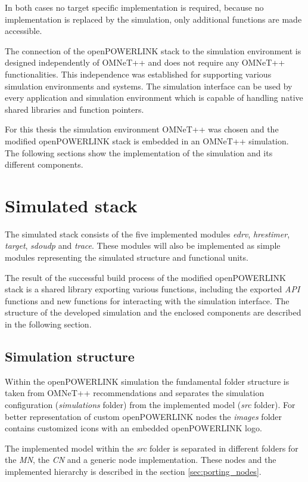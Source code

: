 In both cases no target specific implementation is required, because no implementation is replaced by the simulation, only additional functions are made accessible.

The connection of the openPOWERLINK stack to the simulation environment is designed independently of OMNeT++ and does not require any OMNeT++ functionalities.
This independence was established for supporting various simulation environments and systems.
The simulation interface can be used by every application and simulation environment which is capable of handling native shared libraries and function pointers.

For this thesis the simulation environment OMNeT++ was chosen and the modified openPOWERLINK stack is embedded in an OMNeT++ simulation.
The following sections show the implementation of the simulation and its different components.

\section{Simulated stack}
\label{sec:porting_stack}
The simulated stack consists of the five implemented modules \emph{edrv}, \emph{hrestimer}, \emph{target}, \emph{sdoudp} and \emph{trace}.
These modules will also be implemented as simple modules representing the simulated structure and functional units.

\begin{sloppypar}
The result of the successful build process of the modified openPOWERLINK stack is a shared library exporting various functions, including the exported \emph{API} functions and new functions for interacting with the simulation interface.
The structure of the developed simulation and the enclosed components are described in the following section.
\end{sloppypar}

\subsection{Simulation structure}
\label{sec:porting_stack_simstructure}
Within the openPOWERLINK simulation the fundamental folder structure is taken from OMNeT++ recommendations and separates the simulation configuration (\emph{simulations} folder) from the implemented model (\emph{src} folder).
For better representation of custom openPOWERLINK nodes the \emph{images} folder contains customized icons with an embedded openPOWERLINK logo.

The implemented model within the \emph{src} folder is separated in different folders for the \emph{MN}, the \emph{CN} and a generic node implementation.
These nodes and the implemented hierarchy is described in the section \ref{sec:porting_nodes}.

